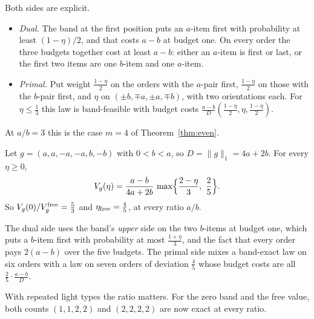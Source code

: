 Both sides are explicit.
\begin{itemize}
\item \emph{Dual.} The band at the first position puts an $a$-item first with probability at
least $(1-\eta)/2$, and that costs $a-b$ at budget one. On every order the three budgets
together cost at least $a-b$: either an $a$-item is first or last, or the first two items are one
$b$-item and one $a$-item.
\item \emph{Primal.} Put weight $\frac{1-\eta}2$ on the orders with the $a$-pair first,
$\frac{1-\eta}2$ on those with the $b$-pair first, and $\eta$ on
$(\pm b,\mp a,\pm a,\mp b)$, with two orientations each. For $\eta\le\frac13$ this law is
band-feasible with budget costs $\frac{a-b}{D}(\frac{1-\eta}2,\eta,\frac{1-\eta}2)$.
\end{itemize}
At $a/b=3$ this is the case $m=4$ of Theorem~\ref{thm:even}.

\begin{theorem}
\label{thm:twomag2211}
Let $g=(a,a,-a,-a,b,-b)$ with $0<b<a$, so $D=\|g\|_1=4a+2b$. For every $\eta\ge0$,
\[
V_g(\eta)=\frac{a-b}{4a+2b}\,\max\Bigl\{\frac{2-\eta}3,\ \frac25\Bigr\}.
\]
So $V_g(0)/V_g^{\rm free}=\frac53$ and $\eta_{\rm free}=\frac45$, at every ratio $a/b$.
\end{theorem}

The dual side uses the band's \emph{upper} side on the two $b$-items at budget one, which puts a
$b$-item first with probability at most $\frac{1+\eta}3$, and the fact that every order pays
$2(a-b)$ over the five budgets. The primal side mixes a band-exact law on six orders with a law
on seven orders of deviation $\frac45$ whose budget costs are all $\frac25\cdot\frac{a-b}{D}$.

With repeated light types the ratio matters. For the zero band and the free value, both counts
$(1,1,2,2)$ and $(2,2,2,2)$ are now exact at every ratio.


